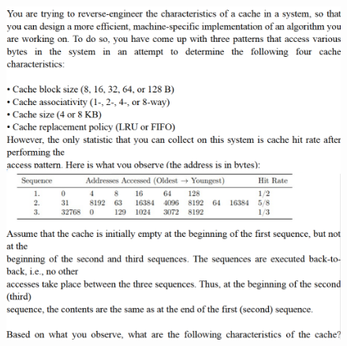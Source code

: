 \documentclass[cn,12pt]{homework}
\begin{document}
\newpage
\begin{problem}
  \quad
  \begin{figure}[H]
    \centering
    \includegraphics[width=1\textwidth]{./figures/image5.png}
    \label{fig:pro1}
  \end{figure}

\end{problem}
\end{document}
